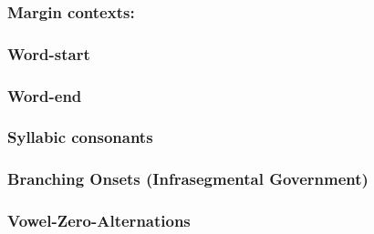 \subsubsection{Margin contexts:}
\subsubsection{Word-start \ctx{\#\_}}\label{intro:obj:word start}
\begin{structure}{}
  \wordstart
\end{structure}


\subsubsection{Word-end \ctx{\_\#}}\label{intro:obj:word end}
\subsubsection{Syllabic consonants}
\subsubsection{Branching Onsets (Infrasegmental Government)}
\subsubsection{Vowel-Zero-Alternations}